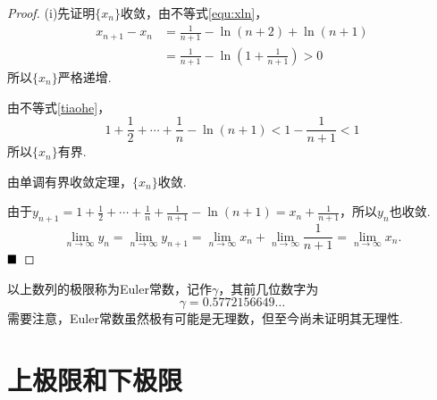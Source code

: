 \begin{proof}
	(i)先证明$\{x_n\}$收敛，由不等式\ref{equ:xln}，
	\begin{align*}
		x_{n+1}-x_n&=\frac{1}{n+1}-\ln(n+2)+\ln(n+1)\\
		&=\frac{1}{n+1}-\ln\left(1+\frac{1}{n+1}\right)>0
	\end{align*}
	所以$\{x_n\}$严格递增.
	
	由不等式\ref{tiaohe}，
	$$1+\frac{1}{2}+\cdots+\frac{1}{n}-\ln(n+1)<1-\frac{1}{n+1}<1$$
	所以$\{x_n\}$有界.
	
	由单调有界收敛定理，$\{x_n\}$收敛.
	
	由于$y_{n+1}=1+\frac{1}{2}+\cdots+\frac{1}{n}+\frac{1}{n+1}-\ln(n+1)=x_n+\frac{1}{n+1}$，所以$y_n$也收敛.
	$$\lim\limits_{n\to\infty}y_n=\lim\limits_{n\to\infty}y_{n+1}=\lim\limits_{n\to\infty}x_n+\lim\limits_{n\to\infty}\frac{1}{n+1}=\lim\limits_{n\to\infty}x_n.$$
	$\hfill\blacksquare$
\end{proof}
\begin{remark}
	以上数列的极限称为{\heiti Euler常数}，记作$\gamma$，其前几位数字为
	$$\gamma=0.5772156649\dots$$
	需要注意，Euler常数虽然极有可能是无理数，但至今尚未证明其无理性.
\end{remark}
\section{上极限和下极限}
